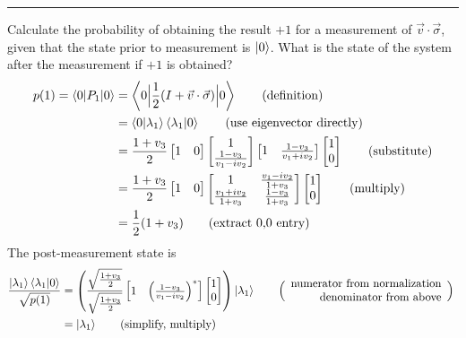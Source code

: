 \vspace{5pt}
\hrule
\vspace{5pt}
 Calculate the probability of obtaining the result $+1$ for a measurement of $\vec{v}\cdot\vec{\sigma}$, given that the state prior to measurement is $\ket{0}$.  What is the state of the system after the measurement if $+1$ is obtained?
\Soln 
\begin{align*}
	p(1) = \braket{0|P_1|0} &= \left\langle 0 \Big\lvert \frac{1}{2} ( I + \vec{v} \cdot \vec{\sigma} ) \Big\rvert 0\right\rangle \tag{definition}\\
	           &= \braket{0|\lambda_1}\braket{\lambda_1|0} \tag{use eigenvector directly}\\
	           &=\frac{1+v_3}{2}\begin{bmatrix}1&0\end{bmatrix}\begin{bmatrix}1 \\ \frac{1-v_3}{v_1-iv_2}\end{bmatrix}\begin{bmatrix}1 & \frac{1-v_3}{v_1+iv_2}\end{bmatrix}\begin{bmatrix}1\\0\end{bmatrix} \tag{substitute}\\
	           &= \frac{1+v_3}{2}\begin{bmatrix}1&0\end{bmatrix} \begin{bmatrix}
    	 1 & \frac{v_1 - iv_2}{1 + v_3} \\
    	 \frac{v_1 + iv_2}{1 + v_3} & \frac{1-v_3}{1+v_3}
	 \end{bmatrix}\begin{bmatrix}1\\0\end{bmatrix} \tag{multiply}\\
		&= \frac{1}{2} (1 + v_3) \tag{extract 0,0 entry}
\end{align*}
The post-measurement state is
\begin{align*} \frac{\ket{\lambda_1}\braket{\lambda_1|0}}{\sqrt{p(1)}} &=\left(\frac{\sqrt{\frac{1+v_3}{2}}}{\sqrt{\frac{1+v_3}{2}}}\begin{bmatrix}1 & \left(\frac{1-v_3}{v_1-iv_2}\right)^*\end{bmatrix}\begin{bmatrix}1\\0\end{bmatrix}\right) \ket{\lambda_1} \tag*{$\Bigl(\Bigr. \begin{array}{r}\text{numerator from normalization}\\ \text{denominator from above}\end{array} \Bigl.\Bigr)$ } \\
&= \ket{\lambda_1} \tag{simplify, multiply}
\end{align*}

